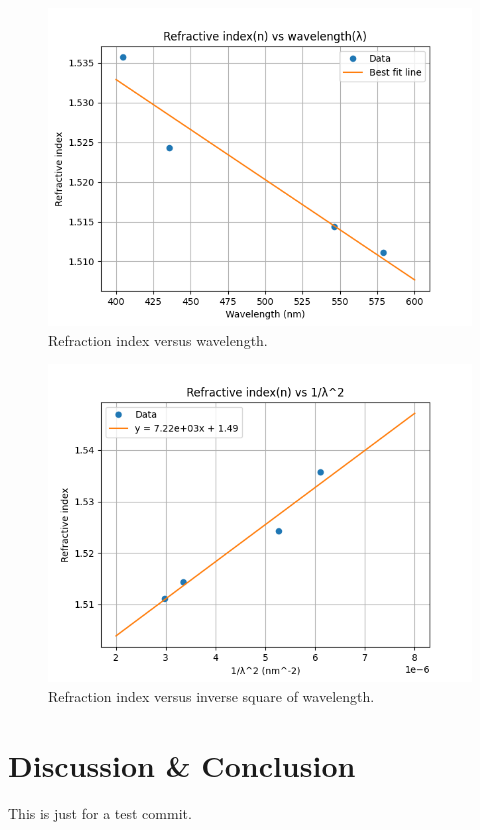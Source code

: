 \documentclass[10pt]{article}
\begin{document}
\begin{figure}[ht]
    \centering
    \includegraphics[scale=0.6]{figures/f2.png}
    \caption{Refraction index versus wavelength.}
    \label{fig:2}
\end{figure}

\begin{figure}[ht]
    \centering
    \includegraphics[scale=0.6]{figures/f3.png}
    \caption{Refraction index versus inverse square of wavelength.}
    \label{fig:3}
\end{figure}

\FloatBarrier

\section{Discussion \& Conclusion}
This is just for a test commit.


\printbibliography
\end{document}
